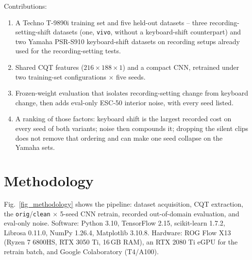 \documentclass[pdflatex,sn-mathphys-num,iicol]{sn-jnl}
\begin{document}
Contributions:
\begin{enumerate}[1.]
\item A Techno T-9890i training set and five held-out datasets -- three recording-setting-shift datasets (one, \texttt{vivo}, without a keyboard-shift counterpart) and two Yamaha PSR-S910 keyboard-shift datasets on recording setups already used for the recording-setting tests.
\item Shared CQT features ($216\times188\times1$) and a compact CNN, retrained under two training-set configurations $\times$ five seeds.
\item Frozen-weight evaluation that isolates recording-setting change from keyboard change, then adds eval-only ESC-50 interior noise, with every seed listed.
\item A ranking of those factors: keyboard shift is the largest recorded cost on every seed of both variants; noise then compounds it; dropping the silent clips does not remove that ordering and can make one seed collapse on the Yamaha sets.
\end{enumerate}

\section{Methodology}\label{sec_methodology}

Fig.~\ref{fig_methodology} shows the pipeline: dataset acquisition, CQT extraction, the \texttt{orig}/\texttt{clean} $\times$ 5-seed CNN retrain, recorded out-of-domain evaluation, and eval-only noise. Software: Python 3.10, TensorFlow 2.15, scikit-learn 1.7.2, Librosa 0.11.0, NumPy 1.26.4, Matplotlib 3.10.8. Hardware: ROG Flow X13 (Ryzen 7 6800HS, RTX 3050 Ti, 16\,GB RAM), an RTX 2080 Ti eGPU for the retrain batch, and Google Colaboratory (T4/A100).
\end{document}
